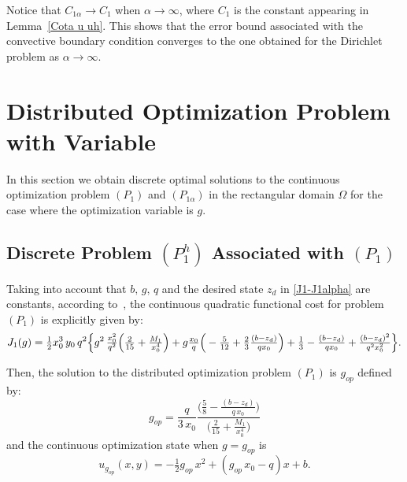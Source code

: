\documentclass[axioms,article,submit,moreauthors]{Definitions/mdpi}
\begin{document}
\begin{Remark}
Notice that $C_{1\alpha}\to C_1$ when $\alpha\to \infty$, where $C_1$ is {the constant appearing} in Lemma~\ref{Cota u uh}. This shows that the error bound associated with the convective boundary condition converges to the one obtained for the Dirichlet problem as $\alpha \to \infty$.

\end{Remark}

\section{Distributed Optimization Problem with Variable }\label{sec3}   
In this section we obtain  discrete optimal  solutions to the continuous optimization problem $(P_1)$ and $(P_{1\alpha})$ in the rectangular domain $\Omega$ for the case where the optimization variable is $g$.

\subsection{Discrete Problem  ${(P^h_{1})}$ Associated with $(P_1)$}\label{sec3.1}
 
 Taking into account that $b, \,g,\,q$ and  the desired state $z_d$  in \eqref{J1-J1alpha} are constants, according to~\cite{BoGaTa2020}, the continuous quadratic  functional cost for problem $(P_1)$ is explicitly given by:
\begin{equation} \label{J1-explicito}   
    J_1(g)= \tfrac{1}{2} x_0^3\, y_0\, q^2 \Big\{ g^2 \,\tfrac{x_0^2}{q^2} \Big(\tfrac{2}{15}  + \tfrac{M_1}{x_0^4} \Big) + g \tfrac{x_0}{q}  \Big(- \tfrac{5}{12}  + \tfrac{2}{3} \tfrac{(b- z_d)}{q x_0} \Big) + \\
    \tfrac{1}{3} - \tfrac{(b-z_d)}{q x_0} + \tfrac{(b-z_d)^2}{q^2x_0^2} \Big\}.
    \end{equation}
    
    
\noindent Then, the solution to the distributed optimization problem $(P_1)$ is $g_{op}$ defined by:
     \begin{equation}\label{gop}
          g_{op} = \frac{q}{3\, x_0} \frac{\Big( \tfrac{5}{8 } -\tfrac{ (b -z_d)}{q \, x_0}\Big)}{\Big(\tfrac{2}{15} + \tfrac{M_1}{x_0^4} \Big)}
     \end{equation}
   \noindent and the continuous optimization state when $g=g_{op}$ is     
       \begin{equation}\label{ugop}
            u_{g_{op}}(x,y) = -\tfrac{1}{2} g_{op}\, x^2 + (g_{op}\, x_0 - q) x +b.
       \end{equation}        
 
\end{document}
